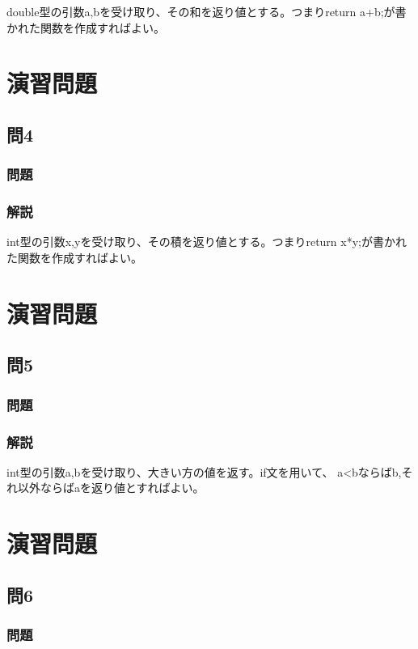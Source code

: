 double型の引数a,bを受け取り、その和を返り値とする。つまりreturn a+b;が書かれた関数を作成すればよい。

\section{演習問題}
\subsection{問4}
\subsubsection{問題}

\subsubsection{解説}

int型の引数x,yを受け取り、その積を返り値とする。つまりreturn x*y;が書かれた関数を作成すればよい。

\section{演習問題}
\subsection{問5}
\subsubsection{問題}

\subsubsection{解説}

int型の引数a,bを受け取り、大きい方の値を返す。if文を用いて、
a<bならばb,それ以外ならばaを返り値とすればよい。

\section{演習問題}
\subsection{問6}
\subsubsection{問題}

